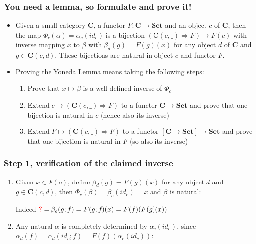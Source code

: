 \documentclass[handout]{beamer}
\newcommand{\To}{\Rightarrow}
\newcommand{\redc}{{\color{red} c}}
\newcommand{\bfsf}[1]{{\boldsymbol{#1}}}
\newcommand{\Set}{\bfsf{Set}}
\newcommand{\CC}{\bfsf{C}}
\begin{document}
\frame
  {   
    \frametitle{You need a lemma, so formulate and prove it!}\label{Yon:Intro}

 \begin{itemize}[<+->]
\item Given a small category $\CC$, a functor $F:\CC\to\Set$ and an
object $c$ of $\CC$, then the map $\Phi_c(\alpha) = \alpha_c(id_c)$ is
a bijection $(\CC(c,\_)\To F)\to F(c)$ with inverse mapping $x$ to $\beta$
with $\beta_d(g)=F(g)(x)$ for any object $d$ of $\CC$ and $g\in\CC(c,d)$.
These bijections are natural in object $c$ and functor $F$.
\item Proving the Yoneda Lemma means taking the following steps:
 \begin{enumerate}
    \item Prove that $x\mapsto\beta$ is a well-defined inverse of $\Phi_c$
    \item Extend $c\mapsto(\CC(c,\_)\To F)$ to a functor $\CC\to\Set$ and
prove that one bijection is natural in $c$ (hence also its inverse)
    \item Extend $F\mapsto(\CC(c,\_)\To F)$ to a functor $[\CC\to\Set]\to\Set$ and
prove that one bijection is natural in $F$ (so also its inverse)
   \end{enumerate}
 \end{itemize}

 }

\frame
  {   
    \frametitle{Step 1, verification of the claimed inverse}\label{Yon:bijection}

 \begin{enumerate}[<+->]
\item Given $x\in F(c)$, define $\beta_d(g)=F(g)(x)$ for any object $d$ 
and $g\in\CC(c,d)$, then $\Phi_c(\beta)=\beta_c(id_c) =x$ and $\beta$ is natural:
Indeed ${\color{red} ?}=\beta_e(g;f)=F(g;f)(x) = F(f)(F(g)(x))$
\item Any natural $\alpha$ is completely determined by $\alpha_c(id_c)$, 
since $\alpha_d(f)=\alpha_d(id_c;f)=F(f)(\alpha_c(id_c))$:\\
 \end{enumerate}

 }
\end{document}
